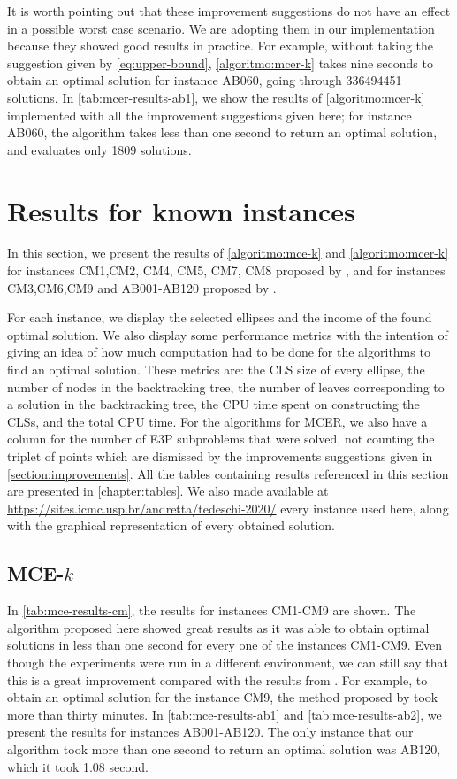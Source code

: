 It is worth pointing out that these improvement suggestions do not have an effect in a possible worst case scenario. We are adopting them in our implementation because they showed good results in practice.
For example, without taking the suggestion given by \autoref{eq:upper-bound}, \autoref{algoritmo:mcer-k} takes nine seconds to obtain an optimal solution for instance AB060, going through \num{336494451} solutions.
In \autoref{tab:mcer-results-ab1}, we show the results of \autoref{algoritmo:mcer-k} implemented with all the improvement suggestions given here; for instance AB060, the algorithm takes less than one second to return an optimal solution, and evaluates only \num{1809} solutions.

\section{Results for known instances}

In this section, we present the results of \autoref{algoritmo:mce-k} and \autoref{algoritmo:mcer-k} for instances CM1,CM2, CM4, CM5, CM7, CM8 proposed by , and for instances CM3,CM6,CM9 and AB001-AB120 proposed by . 

For each instance, we display the selected ellipses and the income of the found optimal solution. 
We also display some performance metrics with the intention of giving an idea of how much computation had to be done for the algorithms to find an optimal solution. These metrics are: 
the CLS size of every ellipse, the number of nodes in the backtracking tree, the number of leaves corresponding to a solution in the backtracking tree, the CPU time spent on constructing the CLSs, and the total CPU time.
For the algorithms for MCER, we also have a column for the number of E3P subproblems that were solved, not counting the triplet of points which are dismissed by the improvements suggestions given in \autoref{section:improvements}. All the tables containing results referenced in this section are presented in \autoref{chapter:tables}. 
We also made available at \url{https://sites.icmc.usp.br/andretta/tedeschi-2020/} every instance used here, along with the graphical representation of every obtained solution.


\subsection{MCE-$k$}

In \autoref{tab:mce-results-cm}, the results for instances CM1-CM9 are shown. 
The algorithm proposed here showed great results as it was able to obtain optimal solutions in less than one second for every one of the instances CM1-CM9.
Even though the experiments were run in a different environment, we can still say that this is a great improvement compared with the results from . For example, to obtain an optimal solution for the instance CM9, the method proposed by  took more than thirty minutes.
In \autoref{tab:mce-results-ab1} and \autoref{tab:mce-results-ab2}, we present the results for instances AB001-AB120. The only instance that our algorithm took more than one second to return an optimal solution was AB120, which it took 1.08 second.

